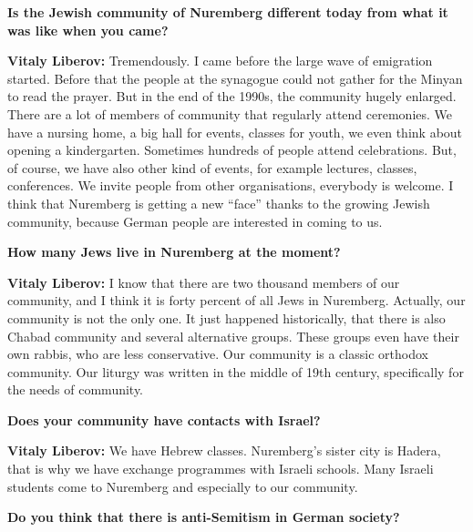 \textbf{Is the Jewish community of Nuremberg different today from what it was like when you came?} 

\textbf{Vitaly Liberov:} Tremendously. I came before the large wave of emigration started. Before that the people at the synagogue could not gather for the Minyan to read the prayer. But in the end of the 1990s, the community hugely enlarged. There are a lot of members of community that regularly attend ceremonies. We have a nursing home, a big hall for events, classes for youth, we even think about opening a kindergarten. Sometimes hundreds of people attend celebrations.  But, of course, we have also other kind of events, for example lectures, classes, conferences. We invite people from other organisations, everybody is welcome. I think that Nuremberg is getting a new “face” thanks to the growing Jewish community, because German people are interested in coming to us.    

\textbf{How many Jews live in Nuremberg at the moment?} 

\textbf{Vitaly Liberov:} I know that there are two thousand members of our community, and I think it is forty percent of all Jews in Nuremberg. Actually, our community is not the only one. It just happened historically, that there is also Chabad community and several alternative groups. These groups even have their own rabbis, who are less conservative. Our community is a classic orthodox community. 
Our liturgy was written in the middle of 19th century, specifically for the needs of community.   

\textbf{Does your community have contacts with Israel?} 

\textbf{Vitaly Liberov:} We have Hebrew classes. Nuremberg’s sister city is Hadera, that is why we have exchange programmes with Israeli schools. Many Israeli students come to Nuremberg and especially to our community. 

\textbf{Do you think that there is anti-Semitism in German society?} 

